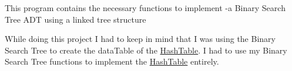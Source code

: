 This program contains the necessary functions to implement -\/a Binary Search Tree A\+DT using a linked tree structure

While doing this project I had to keep in mind that I was using the Binary Search Tree to create the data\+Table of the \hyperlink{class_hash_table}{Hash\+Table}. I had to use my Binary Search Tree functions to implement the \hyperlink{class_hash_table}{Hash\+Table} entirely. 